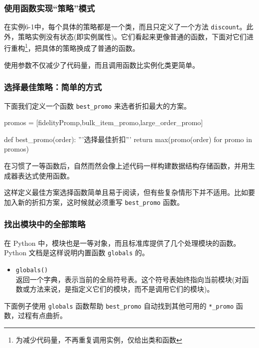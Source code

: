 \subsubsection{使用函数实现``策略''模式}

在实例6-1中，每个具体的策略都是一个类，而且只定义了一个方法 \texttt{discount}。此外，策略实例没有状态(即实例属性)。它们看起来更像普通的函数，下面对它们进行重构\footnote{为减少代码量，不再重复调用实例，仅给出类和函数}，把具体的策略换成了普通的函数。



使用参数不仅减少了代码量，而且调用函数比实例化类更简单。

\subsubsection{选择最佳策略：简单的方式}

下面我们定义一个函数 \texttt{best\_promo} 来选者折扣最大的方案。

\begin{python}
promos = [fidelityPromp,bulk_item_promo,large_order_promo]

def best_promo(order):
    '''选择最佳折扣'''
    return max(promo(order) for promo in promos)
\end{python}

在习惯了一等函数后，自然而然会像上述代码一样构建数据结构存储函数，并用生成器表达式使用函数。

这样定义最佳方案选择函数简单且易于阅读，但有些复杂情形下并不适用。比如要加入新的折扣方案，这时候就必须重写 \texttt{best\_promo} 函数。

\subsubsection{找出模块中的全部策略}

在 Python 中，模块也是一等对象，而且标准库提供了几个处理模块的函数。Python 文档是这样说明内置函数 \texttt{globals} 的。

\begin{itemize}
    \item \texttt{globals()} \\
    返回一个字典，表示当前的全局符号表。这个符号表始终指向当前模块(对函数或方法来说，是指定义它们的模块，而不是调用它们的模块)。
\end{itemize}

下面例子使用 \texttt{globals} 函数帮助 \texttt{best\_promo} 自动找到其他可用的 \texttt{*\_promo} 函数，过程有点曲折。

